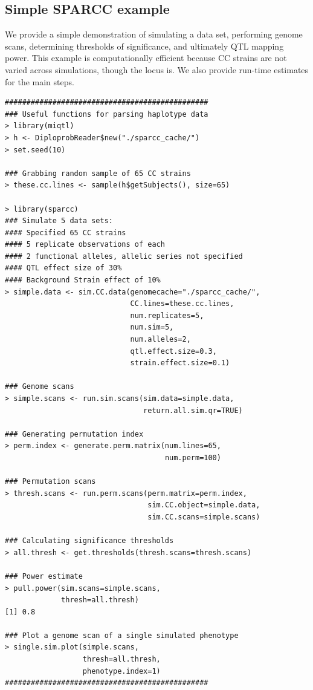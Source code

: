 \subsection{Simple SPARCC example}

We provide a simple demonstration of simulating a data set, performing genome scans, determining thresholds of significance, and ultimately QTL mapping power. This example is computationally efficient because CC strains are not varied across simulations, though the locus is. We also provide run-time estimates for the main steps.

\begin{verbatim}
###############################################
### Useful functions for parsing haplotype data
> library(miqtl) 
> h <- DiploprobReader$new("./sparcc_cache/")
> set.seed(10)

### Grabbing random sample of 65 CC strains
> these.cc.lines <- sample(h$getSubjects(), size=65) 

> library(sparcc)
### Simulate 5 data sets:
#### Specified 65 CC strains
#### 5 replicate observations of each
#### 2 functional alleles, allelic series not specified
#### QTL effect size of 30%
#### Background Strain effect of 10%
> simple.data <- sim.CC.data(genomecache="./sparcc_cache/", 
                           	 CC.lines=these.cc.lines,
                             num.replicates=5,
                             num.sim=5,
                             num.alleles=2,
                             qtl.effect.size=0.3, 
                             strain.effect.size=0.1)

### Genome scans
> simple.scans <- run.sim.scans(sim.data=simple.data,
                                return.all.sim.qr=TRUE)

### Generating permutation index
> perm.index <- generate.perm.matrix(num.lines=65, 
                                     num.perm=100)

### Permutation scans
> thresh.scans <- run.perm.scans(perm.matrix=perm.index, 
                                 sim.CC.object=simple.data, 
                                 sim.CC.scans=simple.scans)

### Calculating significance thresholds
> all.thresh <- get.thresholds(thresh.scans=thresh.scans)

### Power estimate
> pull.power(sim.scans=simple.scans, 
			 thresh=all.thresh)
[1] 0.8

### Plot a genome scan of a single simulated phenotype
> single.sim.plot(simple.scans, 
                  thresh=all.thresh, 
                  phenotype.index=1)
###############################################
\end{verbatim}

